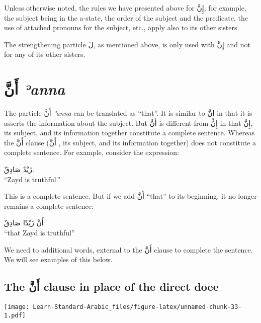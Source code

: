 \documentclass[
  10pt,
]{book}
\begin{document}
Unless otherwise noted, the rules we have presented above for
\foreignlanguage{arabic}{إِنَّ},
for example, the subject being in the a-state, the order of the subject and the predicate, the use of attached pronouns for the subject, etc.,
apply also to its other sisters.

The strengthening particle \foreignlanguage{arabic}{لَ}, as mentioned above, is only used with \foreignlanguage{arabic}{إِنَّ} and not for any of its other sisters.

\section{\texorpdfstring{\foreignlanguage{arabic}{أَنَّ} \emph{ʾanna}}{أَنَّ ʾanna}}\label{ux623ux646-eanna}

The particle
\foreignlanguage{arabic}{أَنَّ} \emph{ʾanna}
can be translated as \enquote{that}.
It is similar to \foreignlanguage{arabic}{إِنَّ} in that it is asserts the information about the subject.
But
\foreignlanguage{arabic}{أَنَّ} is different from \foreignlanguage{arabic}{إِنَّ} in that \foreignlanguage{arabic}{إِنَّ}, its subject, and its information together constitute a complete sentence.
Whereas
the
\foreignlanguage{arabic}{أَنَّ}
clause
(\foreignlanguage{arabic}{أَنَّ}
, its subject, and its information together) does not constitute a complete sentence. For example, consider the expression:

\foreignlanguage{arabic}{زَيْدٌ صَادِقٌ.}\\
\enquote{Zayd is truthful.}

This is a complete sentence. But if we add
\foreignlanguage{arabic}{أَنَّ} \enquote{that} to its beginning, it no longer remains a complete sentence:

\foreignlanguage{arabic}{أَنَّ زَيْدًا صَادِقٌ}\\
\enquote{that Zayd is truthful}

We need to additional words, external to the
\foreignlanguage{arabic}{أَنَّ}
clause
to complete the sentence. We will see examples of this below.

\subsection{\texorpdfstring{The \foreignlanguage{arabic}{أَنَّ} clause in place of the direct doee}{The أَنَّ clause in place of the direct doee}}\label{the-ux623ux646-clause-in-place-of-the-direct-doee}

\texttt{[image: Learn-Standard-Arabic\_files/figure-latex/unnamed-chunk-33-1.pdf]}
\end{document}
